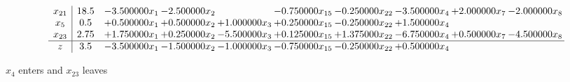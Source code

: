 \documentclass[10pt]{article}
\begin{document}
\[\begin{array}{c| c c@{\hskip 2pt} c@{\hskip 2pt} c@{\hskip 2pt} c@{\hskip 2pt} c@{\hskip 2pt} c@{\hskip 2pt} c@{\hskip 2pt} c@{\hskip 2pt} }
 x_{21}   &  18.5 & -3.500000 x_{1} & -2.500000 x_{2} &   & -0.750000 x_{15} & -0.250000 x_{22} & -3.500000 x_{4} & + 2.000000 x_{7} & -2.000000 x_{8}\\
 x_{5}   &  0.5 & + 0.500000 x_{1} & + 0.500000 x_{2} & + 1.000000 x_{3} & + 0.250000 x_{15} & -0.250000 x_{22} & + 1.500000 x_{4} &    &   \\
 x_{23}   &  2.75 & + 1.750000 x_{1} & + 0.250000 x_{2} & -5.500000 x_{3} & + 0.125000 x_{15} & + 1.375000 x_{22} & -6.750000 x_{4} & + 0.500000 x_{7} & -4.500000 x_{8}\\
\hline
z    &  3.5 & -3.500000 x_{1} & -1.500000 x_{2} & -1.000000 x_{3} & -0.750000 x_{15} & -0.250000 x_{22} & + 0.500000 x_{4} &    &   \\
\end{array}\]


 $ x_{4} $ enters and $ x_{23} $ leaves 
\end{document}
